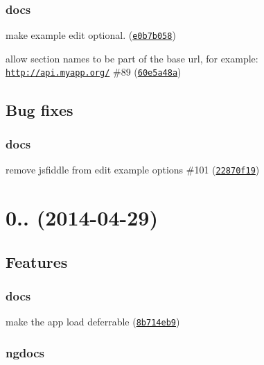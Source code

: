 \subsubsection*{docs}


\begin{DoxyItemize}
\item make example edit optional. (\href{https://github.com/m7r/grunt-ngdocs/commit/e0b7b058}{\tt e0b7b058})
\item allow section names to be part of the base url, for example\+: \href{http://api.myapp.org/}{\tt http\+://api.\+myapp.\+org/} \#89 (\href{https://github.com/m7r/grunt-ngdocs/commit/60e5a48a}{\tt 60e5a48a})
\end{DoxyItemize}

\subsection*{Bug fixes}

\subsubsection*{docs}


\begin{DoxyItemize}
\item remove jsfiddle from edit example options \#101 (\href{https://github.com/m7r/grunt-ngdocs/commit/22870f19}{\tt 22870f19})
\end{DoxyItemize}

\section*{0.. (2014-\/04-\/29)}

\subsection*{Features}

\subsubsection*{docs}


\begin{DoxyItemize}
\item make the app load deferrable (\href{https://github.com/m7r/grunt-ngdocs/commit/8b714eb9}{\tt 8b714eb9})
\end{DoxyItemize}

\subsubsection*{ngdocs}


